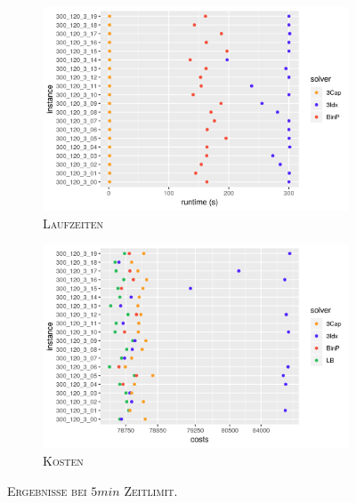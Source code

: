 \begin{figure}[H]
\centering
\begin{subfigure}[b]{0.4\textwidth}
\centering
\includegraphics[width=1.3\textwidth]{img/solver_instance_time_b=3_m_300s.png}
\caption{\textsc{Laufzeiten}}
\label{fig:b=3_m_runtimes}
\end{subfigure}
\hfill
\begin{subfigure}[b]{0.4\textwidth}
\centering
\includegraphics[width=1.3\textwidth]{img/solver_instance_cost_b=3_m_300s.png}
\caption{\textsc{Kosten}}
\label{fig:b=3_m_costs}
\end{subfigure}
\caption{\textsc{Ergebnisse bei $5min$ Zeitlimit}.}
\end{figure}

